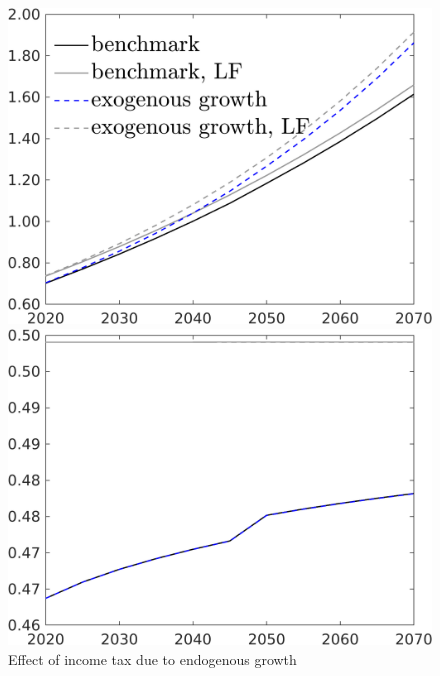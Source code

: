  \begin{figure}[h!!]
 	\centering
 	\caption{Effect of income tax due to endogenous growth  }\label{fig:count_taul_xgr}
 	\begin{minipage}[]{0.32\textwidth}
 		\includegraphics[width=1\textwidth]{../../codding_model/own_basedOnFried/optimalPol_190722_tidiedUp/figures/all_10Aout22/CountXgrTaulLF_target_C_spillover0_sep1_extern0_PV1_etaa0.79_lgd1.png}
 	\end{minipage}
 	\begin{minipage}[]{0.32\textwidth}
 		\includegraphics[width=1\textwidth]{../../codding_model/own_basedOnFried/optimalPol_190722_tidiedUp/figures/all_10Aout22/CountXgrTaulLF_target_hh_spillover0_sep1_extern0_PV1_etaa0.79_lgd0.png}

\end{minipage}
\end{figure}
